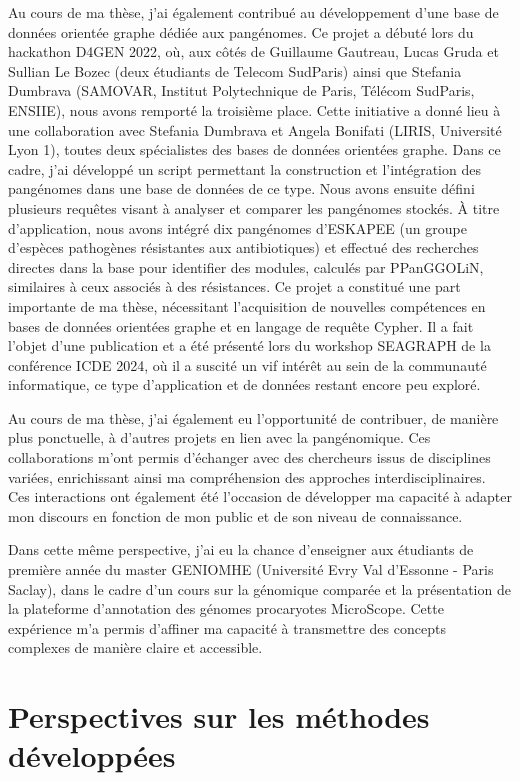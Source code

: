 Au cours de ma thèse, j’ai également contribué au développement d’une base de données orientée graphe dédiée aux pangénomes. Ce projet a débuté lors du hackathon D4GEN 2022, où, aux côtés de Guillaume Gautreau, Lucas Gruda et Sullian Le Bozec (deux étudiants de Telecom SudParis) ainsi que Stefania Dumbrava (SAMOVAR, Institut Polytechnique de Paris, Télécom SudParis, ENSIIE), nous avons remporté la troisième place. Cette initiative a donné lieu à une collaboration avec Stefania Dumbrava et Angela Bonifati (LIRIS, Université Lyon 1), toutes deux spécialistes des bases de données orientées graphe. Dans ce cadre, j’ai développé un script permettant la construction et l’intégration des pangénomes dans une base de données de ce type. Nous avons ensuite défini plusieurs requêtes visant à analyser et comparer les pangénomes stockés. À titre d’application, nous avons intégré dix pangénomes d’ESKAPEE (un groupe d’espèces pathogènes résistantes aux antibiotiques) et effectué des recherches directes dans la base pour identifier des modules, calculés par PPanGGOLiN, similaires à ceux associés à des résistances. Ce projet a constitué une part importante de ma thèse, nécessitant l’acquisition de nouvelles compétences en bases de données orientées graphe et en langage de requête Cypher. Il a fait l’objet d’une publication et a été présenté lors du workshop SEAGRAPH de la conférence ICDE 2024, où il a suscité un vif intérêt au sein de la communauté informatique, ce type d’application et de données restant encore peu exploré.

Au cours de ma thèse, j’ai également eu l’opportunité de contribuer, de manière plus ponctuelle, à d’autres projets en lien avec la pangénomique. Ces collaborations m’ont permis d’échanger avec des chercheurs issus de disciplines variées, enrichissant ainsi ma compréhension des approches interdisciplinaires. Ces interactions ont également été l’occasion de développer ma capacité à adapter mon discours en fonction de mon public et de son niveau de connaissance.

Dans cette même perspective, j’ai eu la chance d’enseigner aux étudiants de première année du master GENIOMHE (Université Evry Val d'Essonne - Paris Saclay), dans le cadre d’un cours sur la génomique comparée et la présentation de la plateforme d’annotation des génomes procaryotes MicroScope. Cette expérience m’a permis d’affiner ma capacité à transmettre des concepts complexes de manière claire et accessible.

\chapter{Perspectives sur les méthodes développées}

